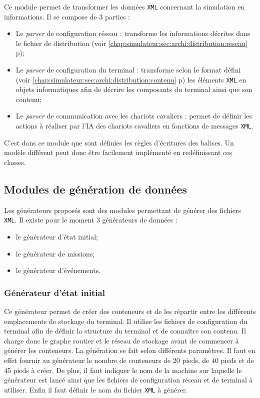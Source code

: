 Ce module permet de transformer les données \verb!XML! concernant la simulation en informations. Il se compose de 3 parties :
\begin{itemize}
 \item Le \textit{parser} de configuration réseau : transforme les informations décrites dans le fichier de distribution (voir \ref{chap:simulateur:sec:archi:distribution:reseau} p\pageref{chap:simulateur:sec:archi:distribution:reseau});
 \item Le \textit{parser} de configuration du terminal : transforme selon le format défini (voir \ref{chap:simulateur:sec:archi:distribution:contenu} p\pageref{chap:simulateur:sec:archi:distribution:contenu}) les éléments \verb!XML! en objets informatiques afin de décrire les composants du terminal ainsi que son contenu;
 \item Le \textit{parser} de communication avec les chariots cavaliers : permet de définir les actions à réaliser par l'IA des chariots cavaliers en fonctions de messages \verb!XML!.
\end{itemize}
C'est dans ce module que sont définies les règles d'écritures des balises. Un modèle différent peut donc être facilement implémenté en redéfinissant ces classes.

\subsection{Modules de génération de données}
Les générateurs proposés sont des modules permettant de générer des fichiers \verb!XML!. Il existe pour le moment 3 générateurs de données :
\begin{itemize}
 \item le générateur d'état initial;
 \item le générateur de missions;
 \item le générateur d'événements.
\end{itemize}

\subsubsection{Générateur d'état initial}

Ce générateur permet de créer des conteneurs et de les répartir entre les différents emplacements de stockage du terminal. Il utilise les fichiers de configuration du terminal afin de définir la structure du terminal et de connaître son contenu. Il charge donc le graphe routier et le réseau de stockage avant de commencer à générer les conteneurs. La génération se fait selon différents paramètres. Il faut en effet fournir au générateur le nombre de conteneurs de 20 pieds, de 40 pieds et de 45 pieds à créer. De plus, il faut indiquer le nom de la machine sur laquelle le générateur est lancé ainsi que les fichiers de configuration réseau et de terminal à utiliser. Enfin il faut définir le nom du fichier \verb!XML! à générer.

